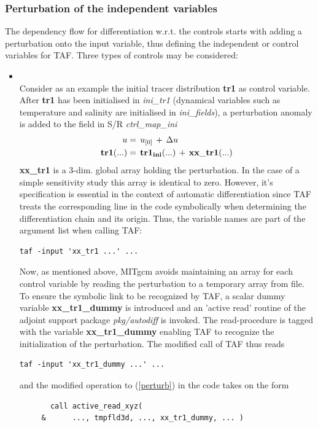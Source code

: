 \subsubsection{Perturbation of the independent variables}
%
The dependency flow for differentiation w.r.t. the controls 
starts with adding a perturbation onto the input variable,
thus defining the independent or control variables for TAF.
Three types of controls may be considered:
%
\begin{itemize}
%
\item 
{}
\\
%
Consider as an example the initial tracer distribution
{\bf tr1} as control variable.
After {\bf tr1} has been initialised in
{\it ini\_tr1} (dynamical variables such as
temperature and salinity are initialised in {\it ini\_fields}),
a perturbation anomaly is added to the field in S/R
{\it ctrl\_map\_ini}
%
\begin{equation}
\begin{aligned}
u         & = \, u_{[0]} \, + \, \Delta u \\
{\bf tr1}(...) & = \, {\bf tr1_{ini}}(...) \, + \, {\bf xx\_tr1}(...)
\label{perturb}
\end{aligned}
\end{equation}
%
{\bf xx\_tr1} is a 3-dim. global array 
holding the perturbation. In the case of a simple
sensitivity study this array is identical to zero.
However, it's specification is essential in the context
of automatic differentiation since TAF
treats the corresponding line in the code symbolically
when determining the differentiation chain and its origin.
Thus, the variable names are part of the argument list
when calling TAF: 
%
\begin{verbatim}
taf -input 'xx_tr1 ...' ...
\end{verbatim}
%
Now, as mentioned above, MITgcm avoids maintaining
an array for each control variable by reading the
perturbation to a temporary array from file.
To ensure the symbolic link to be recognized by TAF, a scalar
dummy variable {\bf xx\_tr1\_dummy} is introduced
and an 'active read' routine of the adjoint support
package {\it pkg/autodiff} is invoked.
The read-procedure is tagged with the variable
{\bf xx\_tr1\_dummy} enabling TAF to recognize the
initialization of the perturbation.
The modified call of TAF thus reads
%
\begin{verbatim}
taf -input 'xx_tr1_dummy ...' ...
\end{verbatim}
%
and the modified operation to (\ref{perturb})
in the code takes on the form
%
\begin{verbatim}
       call active_read_xyz( 
     &      ..., tmpfld3d, ..., xx_tr1_dummy, ... )


\end{verbatim}
\end{itemize}
